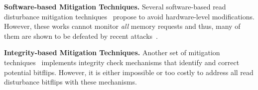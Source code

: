 \noindent
\textbf{Software-based Mitigation Techniques.}
Several software-based read disturbance mitigation techniques~\cite{konoth2018zebram, van2018guardion, brasser2017can, bock2019riprh, aweke2016anvil, zhang2022softtrr, enomoto2022efficient} propose to avoid hardware-level modifications. However, these works cannot monitor \textit{all} memory requests and thus, {many} of them are shown to be defeated by recent attacks~\cite{qiao2016new, gruss2016rowhammer, gruss2018another, cojocar2019eccploit, zhang2019telehammer, kwong2020rambleed, zhang2020pthammer}.

\noindent
\textbf{Integrity-based Mitigation Techniques.}
Another set of mitigation techniques~\integrityBasedMitigationsAllCitations{} implements integrity check mechanisms that identify and correct potential bitflips.
However, it is either impossible or too costly to address all read disturbance bitflips with these mechanisms.



